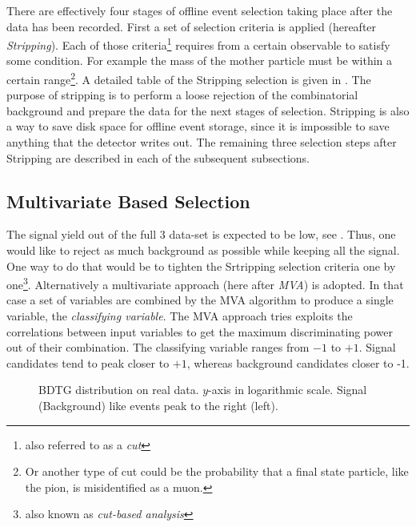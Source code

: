 
There are effectively four stages of offline event selection taking place after the data has been recorded. 
First a set of selection criteria is applied (hereafter {\it Stripping}). Each of those criteria\footnote{also referred to as a {\it cut}}
requires from a certain observable to satisfy some condition. For example the mass of the mother particle \Bs must be within
a certain range\footnote{Or another type of cut could be the probability that a final state particle, like the pion, is misidentified
as a muon.}.  A detailed table of the Stripping selection is given in . The purpose of stripping is to perform
a loose rejection of the combinatorial background and prepare the data for the next stages of selection. Stripping is also a way to save
disk space for offline event storage, since it is impossible to save anything that the detector writes out. The remaining three selection
steps after Stripping are described in each of the subsequent subsections.

\subsection{Multivariate Based Selection}
\label{Multivariate_Based_Selection}

The \BsJpsiKst signal yield out of the full 3 \invfb data-set is expected to be low, see . Thus, one would like to
reject as much background as possible while keeping all the signal. One way to do that would be to tighten the Srtripping selection criteria
one by one\footnote{also known as {\it cut-based analysis}}. Alternatively a multivariate approach (here after {\it MVA}) is adopted. 
In that case a set of variables are combined by the MVA algorithm to produce a single variable, the {\it classifying variable}. 
The MVA approach tries exploits the correlations between input variables to get the maximum discriminating power out of their combination.
The classifying variable ranges from $-1$ to $+1$. Signal candidates tend to peak closer to $+1$, whereas background candidates closer to -1. 

\begin{figure}[h]
\begin{center}
  \scalebox{1}{}
  \caption{BDTG distribution on real data. $y$-axis in logarithmic scale. Signal (Background) like events peak to the right (left). }
  \label{BTDG_performance}
\end{center}
\end{figure}


